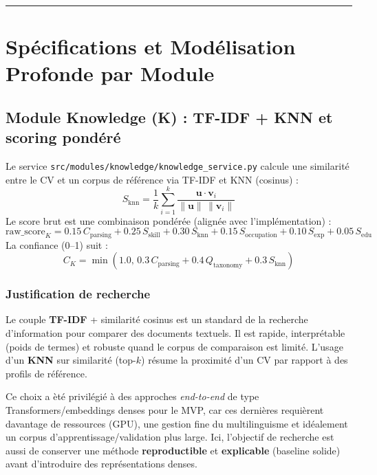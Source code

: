 \documentclass[11pt,a4paper]{article}
\newcommand{\sectionrule}{\par\noindent\rule{\linewidth}{0.4pt}\par}
\begin{document}
\sectionrule

\section{Sp\'ecifications et Mod\'elisation Profonde par Module}

\subsection{Module Knowledge (K) : TF-IDF + KNN et scoring pond\'er\'e}
Le service \texttt{src/modules/knowledge/knowledge\_service.py} calcule une similarit\'e entre le CV et un corpus de r\'ef\'erence via TF-IDF et KNN (cosinus) :
\begin{equation}
S_{\text{knn}} = \frac{1}{k}\sum_{i=1}^{k} \frac{\mathbf{u} \cdot \mathbf{v}_i}{\lVert\mathbf{u}\rVert\, \lVert\mathbf{v}_i\rVert}
\end{equation}
Le score brut est une combinaison pond\'er\'ee (align\'ee avec l'impl\'ementation) :
\begin{equation}
\text{raw\_score}_K = 0.15\,C_{\text{parsing}} + 0.25\,S_{\text{skill}} + 0.30\,S_{\text{knn}} + 0.15\,S_{\text{occupation}} + 0.10\,S_{\text{exp}} + 0.05\,S_{\text{edu}}
\end{equation}
La confiance (0--1) suit :
\begin{equation}
C_K = \min\left(1.0,\, 0.3\,C_{\text{parsing}} + 0.4\,Q_{\text{taxonomy}} + 0.3\,S_{\text{knn}}\right)
\end{equation}

\subsubsection*{Justification de recherche}
Le couple \textbf{TF-IDF} + similarit\'e cosinus est un standard de la recherche d'information pour comparer des documents textuels. Il est rapide, interpr\'etable (poids de termes) et robuste quand le corpus de comparaison est limit\'e. L'usage d'un \textbf{KNN} sur similarit\'e (top-$k$) r\'esume la proximit\'e d'un CV par rapport \`a des profils de r\'ef\'erence.

 Ce choix a \`et\'e privil\'egi\'e \`a des approches \textit{end-to-end} de type Transformers/embeddings denses pour le MVP, car ces derni\`eres requi\`erent davantage de ressources (GPU), une gestion fine du multilinguisme et id\'ealement un corpus d'apprentissage/validation plus large. Ici, l'objectif de recherche est aussi de conserver une m\'ethode \textbf{reproductible} et \textbf{explicable} (baseline solide) avant d'introduire des repr\'esentations denses.
\end{document}
